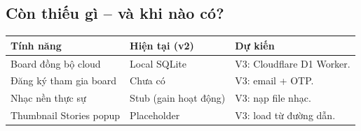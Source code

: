 \documentclass[12pt,a4paper]{article}
\begin{document}
\subsection{Còn thiếu gì -- và khi nào có?}

\vspace{4pt}
\begin{tabularx}{\linewidth}{|l|l|X|}
    \hline
    \textbf{Tính năng}         & \textbf{Hiện tại (v2)} & \textbf{Dự kiến} \\
    \hline
    Board đồng bộ cloud        & Local SQLite           & V3: Cloudflare D1 Worker. \\
    \hline
    Đăng ký tham gia board         & Chưa có                & V3: email + OTP. \\
    \hline
    Nhạc nền thực sự           & Stub (gain hoạt động)  & V3: nạp file nhạc. \\
    \hline
    Thumbnail Stories popup    & Placeholder            & V3: load từ đường dẫn. \\
    \hline
\end{tabularx}

\label{LastPageGameConsoleGuide}
\end{document}
